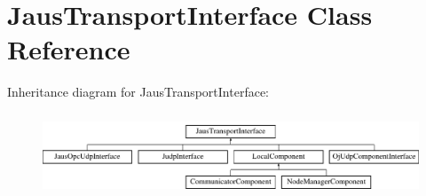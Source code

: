 \hypertarget{class_jaus_transport_interface}{\section{\-Jaus\-Transport\-Interface \-Class \-Reference}
\label{class_jaus_transport_interface}
}
\-Inheritance diagram for \-Jaus\-Transport\-Interface\-:\begin{figure}[H]
\begin{center}
\leavevmode
\includegraphics[height=2.500000cm]{class_jaus_transport_interface}
\end{center}
\end{figure}
